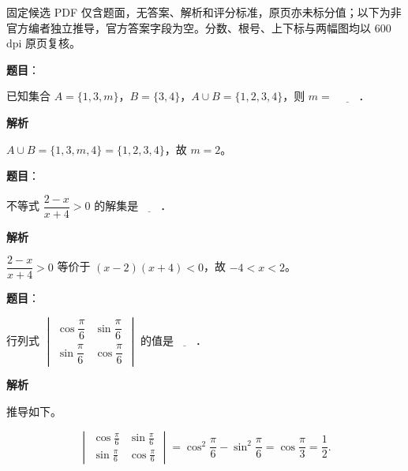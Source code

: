

\begin{gktip}
固定候选 PDF 仅含题面，无答案、解析和评分标准，原页亦未标分值；以下为非官方编者独立推导，官方答案字段为空。分数、根号、上下标与两幅图均以 600 dpi 原页复核。
\end{gktip}

\begin{answer}

\textbf{题目}：

已知集合 $A=\{1,3,m\}$，$B=\{3,4\}$，$A\cup B=\{1,2,3,4\}$，则 $m=$ $\underline{\qquad}$．

\textbf{解析}

$A\cup B=\{1,3,m,4\}=\{1,2,3,4\}$，故 $m=2$。


\end{answer}
\begin{answer}

\textbf{题目}：

不等式 $\dfrac{2-x}{x+4}>0$ 的解集是$\underline{\qquad}$．

\textbf{解析}

$\dfrac{2-x}{x+4}>0$ 等价于 $(x-2)(x+4)<0$，故 $-4<x<2$。


\end{answer}
\begin{answer}

\textbf{题目}：

行列式 $\begin{vmatrix}\cos\dfrac\pi6&\sin\dfrac\pi6\\ \sin\dfrac\pi6&\cos\dfrac\pi6\end{vmatrix}$ 的值是$\underline{\qquad}$．

\textbf{解析}

推导如下。

\nopagebreak[4]
\[\begin{vmatrix}\cos\frac\pi6&\sin\frac\pi6\\ \sin\frac\pi6&\cos\frac\pi6\end{vmatrix}
=\cos^2\frac\pi6-\sin^2\frac\pi6=\cos\frac\pi3=\frac12.\]


\end{answer}
